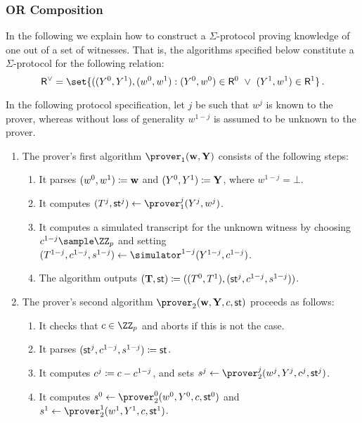 \documentclass[runningheads,11pt]{article}
\begin{document}
\subsubsection{OR Composition}
  In the following we explain how to construct a $\Sigma$-protocol proving knowledge of one out of a set of witnesses.
  That is, the algorithms specified below constitute a $\Sigma$-protocol for the following relation:
\[
  \relation^\lor = \set{
    ((\statement^0,\statement^1),(\witness^0,\witness^1) :
    (\statement^0,\witness^0)\in \relation^0 ~\lor~ (\statement^1,\witness^1)\in\relation^1}\,.
\]

  In the following protocol specification, let $j$ be such that $w^j$ is known to the prover, whereas without loss of generality $w^{1-j}$ is assumed to be unknown to the prover.
\begin{enumerate}
  \item
    The prover's first algorithm $\prover_1(\vec \witness, \vec \statement)$ consists of the following steps:
    \begin{enumerate}
      \item
        It parses $(w^0,w^1)\coloneqq \mathbf {w}$ and $(Y^0,Y^1)\coloneqq \mathbf {Y}$, where $w^{1-j}=\bot$.
      \item
        It computes $(\commitment^j,\st^j)\gets\prover_1^j(Y^j,w^j)$.
      \item
        It computes a simulated transcript for the unknown witness by choosing $c^{1-j}\sample\ZZ_p$ and setting $(\commitment^{1-j},c^{1-j},s^{1-j})\gets\simulator^{1-j}(Y^{1-j},c^{1-j})$.
      \item
	The algorithm outputs $(\mathbf {T},\mathsf{st}) \coloneqq ((T^0,T^1),(\mathsf{st}^j,c^{1-j},s^{1-j}))$.
    \end{enumerate}
  \item
    The prover's second algorithm $\prover_2(\vec \witness, \vec \statement,\challenge,\st)$ proceeds as follows:
    \begin{enumerate}
      \item
        It checks that $c\in\ZZ_p$ and aborts if this is not the case.
      \item
	It parses $(\mathsf{st}^j,c^{1-j},s^{1-j})\coloneqq\mathsf{st}$.
      \item
        It computes $c^j\coloneqq c-c^{1-j}$, and sets $s^j\gets\prover_2^j(w^j,Y^j,c^j,\st^j)$.
      \item
        It computes $s^0\gets\prover_2^0(\witness^0,\statement^0,\challenge,\st^0)$ and $s^1\gets\prover_2^1(\witness^1,\statement^1,\challenge,\st^1)$.

\end{enumerate}
\end{enumerate}
\end{document}
